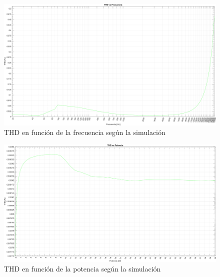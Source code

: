 \begin{figure}[H]
    \centering
    \includegraphics[scale=0.4]{./img/simulaciones/THD/THD_vs_frequency_sim.png}
    \caption{THD en función de la frecuencia según la simulación}
    \label{fig:THD_vs_frequency_sim}
\end{figure}

\begin{figure}[H]
    \centering
    \includegraphics[scale=0.4]{./img/simulaciones/THD/THD_vs_power_sim.png}
    \caption{THD en función de la potencia según la simulación}
    \label{fig:THD_vs_power_sim}
\end{figure}